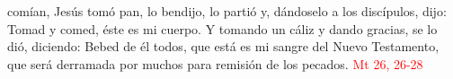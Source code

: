 comían, Jesús tomó pan, lo bendijo, lo partió y, dándoselo a los discípulos, dijo: Tomad y comed, éste es mi cuerpo. Y tomando un cáliz y dando gracias,
se lo dió, diciendo: Bebed de él todos, que está es mi sangre del Nuevo Testamento, que será derramada por muchos para remisión de los pecados.
\textcolor{red}{Mt 26, 26-28}